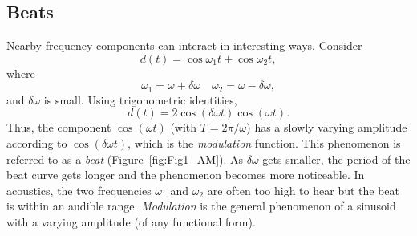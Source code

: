 \subsection{Beats}
Nearby frequency components can interact in interesting ways.  Consider 
\begin{equation}
d(t) = \cos \omega_1t + \cos \omega_2 t,
\end{equation}	 
where
\begin{equation}
\omega_1 = \omega + \delta \omega \quad \omega_2 = \omega - \delta \omega,
\end{equation}
and $\delta \omega$ is small.  Using trigonometric identities,
\begin{equation}
d(t) = 2 \cos (\delta \omega t)\cos(\omega t).
\end{equation}
Thus, the component $\cos (\omega t)$ (with $T = 2 \pi/\omega$) has a slowly varying amplitude according to $\cos 
( \delta \omega t)$, which is the \emph{modulation} function.  This phenomenon is referred to as a \emph{beat} (Figure~\ref{fig:Fig1_AM}).
As $\delta \omega$ gets smaller, the period of the beat curve gets longer and the phenomenon becomes more 
noticeable. In acoustics, the two frequencies $\omega _1$ and $\omega_ 2$ are often too high to hear but the beat is 
within an audible range.  \emph{Modulation} is the general phenomenon of a sinusoid with a varying 
amplitude (of any functional form).

